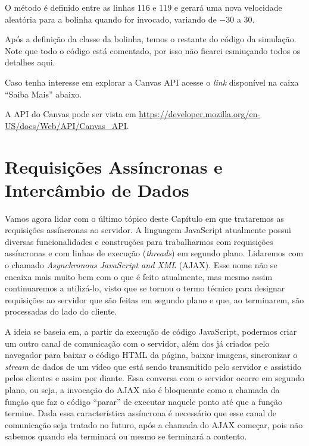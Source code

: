 O método  é definido entre as linhas 116 e 119 e gerará uma nova velocidade aleatória para a bolinha quando for invocado, variando de $-30$ a $30$.

Após a definição da classe da bolinha, temos o restante do código da simulação. Note que todo o código está comentado, por isso não ficarei esmiuçando todos os detalhes aqui.

Caso tenha interesse em explorar a Canvas API acesse o \textit{link} disponível na caixa ``Saiba Mais'' abaixo.

\begin{saibaMais}
    A API do Canvas pode ser vista em \url{https://developer.mozilla.org/en-US/docs/Web/API/Canvas_API}.
\end{saibaMais}



\section{Requisições Assíncronas e Intercâmbio de Dados}

Vamos agora lidar com o último tópico deste Capítulo em que trataremos as requisições assíncronas ao servidor. A linguagem JavaScript atualmente possui diversas funcionalidades e construções para trabalharmos com requisições assíncronas e com linhas de execução (\textit{threads}) em segundo plano. Lidaremos com o chamado \textit{Asynchronous JavaScript and XML} (AJAX). Esse nome não se encaixa mais muito bem com o que é feito atualmente, mas mesmo assim continuaremos a utilizá-lo, visto que se tornou o termo técnico para designar requisições ao servidor que são feitas em segundo plano e que, ao terminarem, são processadas do lado do cliente.

A ideia se baseia em, a partir da execução de código JavaScript, podermos criar um outro canal de comunicação com o servidor, além dos já criados pelo navegador para baixar o código HTML da página, baixar imagens, sincronizar o \textit{stream} de dados de um vídeo que está sendo transmitido pelo servidor e assistido pelos clientes e assim por diante. Essa conversa com o servidor ocorre em segundo plano, ou seja, a invocação do AJAX não é bloqueante como a chamada da função  que faz o código ``parar'' de executar naquele ponto até que a função termine. Dada essa característica assíncrona é necessário que esse canal de comunicação seja tratado no futuro, após a chamada do AJAX começar, pois não sabemos quando ela terminará ou mesmo se terminará a contento.

